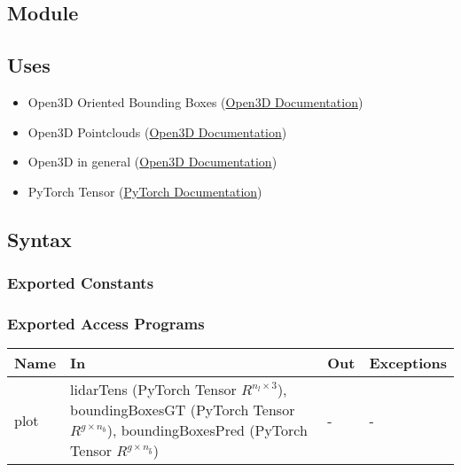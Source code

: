 \documentclass[12pt, titlepage]{article}
\begin{document}
\subsection{Module}



\subsection{Uses}
\begin{itemize}
  \item Open3D Oriented Bounding Boxes (\href{https://www.open3d.org/docs/latest/python_api/open3d.geometry.OrientedBoundingBox.html}{Open3D Documentation})
  \item Open3D Pointclouds (\href{https://www.open3d.org/docs/release/python_api/open3d.geometry.PointCloud.html}{Open3D Documentation})
  \item Open3D in general (\href{https://www.open3d.org/docs/release/introduction.html}{Open3D Documentation})
  \item PyTorch Tensor (\href{https://pytorch.org/docs/stable/tensors.html}{PyTorch Documentation})
\end{itemize}

\subsection{Syntax}



\subsubsection{Exported Constants}



\subsubsection{Exported Access Programs}

\begin{center}
\begin{tabular}{p{2cm}|p{6cm}|p{2cm}|p{2cm}}
\hline
\textbf{Name} & \textbf{In} & \textbf{Out} & \textbf{Exceptions} \\
\hline
plot & lidarTens (PyTorch Tensor $R^{n_{l}\times{}3}$), boundingBoxesGT (PyTorch Tensor $R^{g\times{}n_{b}}$), boundingBoxesPred (PyTorch Tensor $R^{g\times{}n_{\hat{b}}}$) & - & - \\
\hline
\end{tabular}
\end{center}
\end{document}
